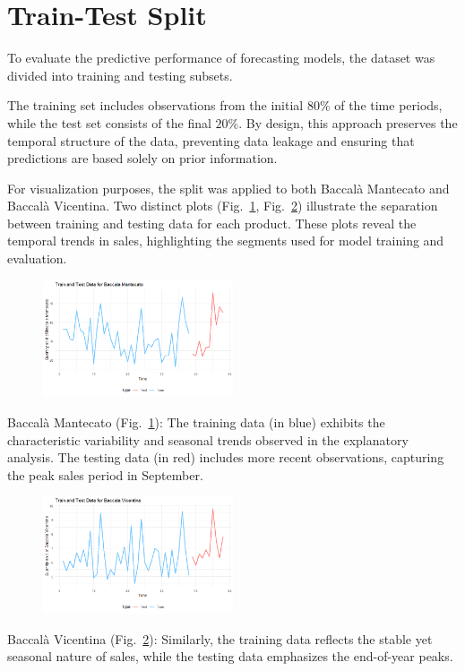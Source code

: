 \documentclass[10pt,twocolumn,letterpaper]{article}
\begin{document}
\section{Train-Test Split}
To evaluate the predictive performance of forecasting models, the dataset was divided into training and testing subsets.

The training set includes observations from the initial $80$\% of the time periods, while the test set consists of the final $20$\%. By design, this approach preserves the temporal structure of the data, preventing data leakage and ensuring that predictions are based solely on prior information.

For visualization purposes, the split was applied to both Baccalà Mantecato and Baccalà Vicentina. Two distinct plots (Fig.~\ref{fig:TRAIN_TEST_MAN}, Fig.~\ref{fig:TRAIN_TEST_VIC}) illustrate the separation between training and testing data for each product. These plots reveal the temporal trends in sales, highlighting the segments used for model training and evaluation.

\begin{figure}[H]
    \centering
    \includegraphics[width=0.5\textwidth]{PlotsBEFD/TRAIN_TEST_MAN.png} 
    \caption{}
    \label{fig:TRAIN_TEST_MAN}
\end{figure}
Baccalà Mantecato (Fig.~\ref{fig:TRAIN_TEST_MAN}): The training data (in blue) exhibits the characteristic variability and seasonal trends observed in the explanatory analysis. The testing data (in red) includes more recent observations, capturing the peak sales period in September.
\begin{figure}[H]
    \centering
    \includegraphics[width=0.5\textwidth]{PlotsBEFD/TRAIN_TEST_VIC.png} 
    \caption{}
    \label{fig:TRAIN_TEST_VIC}
\end{figure}
Baccalà Vicentina (Fig.~\ref{fig:TRAIN_TEST_VIC}): Similarly, the training data reflects the stable yet seasonal nature of sales, while the testing data emphasizes the end-of-year peaks.
\end{document}
